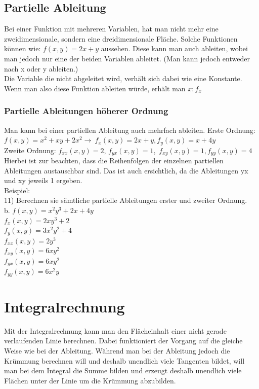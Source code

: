 \documentclass{article}
\begin{document}
	\subsection{Partielle Ableitung}
	Bei einer Funktion mit mehreren Variablen, hat man nicht mehr eine zweidimensionale, sondern eine dreidimensionale Fläche. Solche Funktionen können wie: $f(x,y)=2x+y$ aussehen. Diese kann man auch ableiten, wobei man jedoch nur eine der beiden Variablen ableitet. (Man kann jedoch entweder nach x oder y ableiten.) \\
	Die Variable die nicht abgeleitet wird, verhält sich dabei wie eine Konstante. \\
	Wenn man also diese Funktion ableiten würde, erhält man $x:f_x$
	\subsubsection{Partielle Ableitungen höherer Ordnung}
	Man kann bei einer partiellen Ableitung auch mehrfach ableiten. 
	Erste Ordnung: $f(x,y)=x^2+xy+2x^2\to\ f_x(x,y)=2x+y, f_y(x,y)=x+4y$ \\
	Zweite Ordnung: $f_{xx}(x,y)=2$, $f_{yx}(x,y)=1$,\ $f_{xy}(x,y)=1, f_{yy}(x,y)=4$ \\
	Hierbei ist zur beachten, dass die Reihenfolgen der einzelnen partiellen Ableitungen austauschbar sind. Das ist auch ersichtlich, da die Ableitungen yx und xy jeweils 1 ergeben. \\
	Beispiel: \\
	11) Berechnen sie sämtliche partielle Ableitungen erster und zweiter Ordnung. \\
	b. \textbf{$f(x,y)=x^2y^3+2x+4y$} \\
	$f_x(x,y)=2xy^3+2$ \\
	$f_y(x,y)=3x^2y^2+4$ \\
	$f_{xx}(x,y)=2y^3$ \\
	$f_{xy}(x,y)=6xy^2$ \\
	$f_{yx}(x,y)=6xy^2$ \\
	$f_{yy}(x,y)=6x^2y$ \\
	\section{Integralrechnung}
	Mit der Integralrechnung kann man den Flächeinhalt einer nicht gerade verlaufenden Linie berechnen. Dabei funktioniert der Vorgang auf die gleiche Weise wie bei der Ableitung. Während man bei der Ableitung jedoch die Krümmung berechnen will und deshalb unendlich viele Tangenten bildet, will man bei dem Integral die Summe bilden und erzeugt deshalb unendlich viele Flächen unter der Linie um die Krümmung abzubilden.
\end{document}
